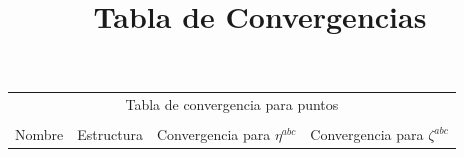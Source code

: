 \documentclass[11pt]{article}
\title{Tabla de Convergencias}
\date{}
\begin{document}
\thispagestyle{empty}


\begin{table}[h!]
\begin{tabular}[b]{ l c c c }

	\multicolumn{4}{c}{ Tabla de convergencia para puntos \vk} \\ \\
	\hline
	\hline

	{ Nombre} & { Estructura} & { \hspace{5mm} Convergencia para $\eta^{abc}$} \hspace{5mm} & { \hspace{5mm} Convergencia para $\zeta^{abc}$} \hspace{5mm} \\ 
	
	\hline
	\hline
	

\end{tabular}
\end{table}
\end{document}
